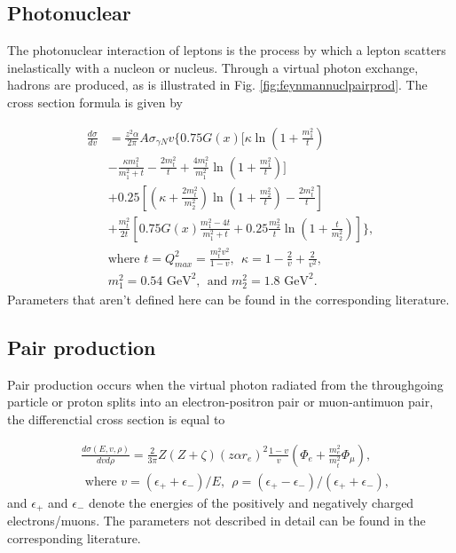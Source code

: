 \subsection{Photonuclear}
The photonuclear interaction of leptons is the process by which a lepton scatters inelastically with a nucleon or nucleus. Through a virtual photon exchange, hadrons are produced, as is illustrated in Fig. \ref{fig:feynmannuclpairprod}. The cross section formula is given by

\begin{equation} 
\begin{split} 
\frac{d\sigma}{dv} &= \frac{z^2 \alpha}{2\pi} A \sigma_{\gamma N} v  \Bigg \lbrace  0.75 G(x) \Bigg [\kappa \ln \left(1+\frac{m_1^2}{t}\right) \\
& -\frac{\kappa m_1^2}{m_1^2 + t} - \frac{2 m_t^2}{t} + \frac{4 m_t^2}{m_1^2} \ln \left(1+ \frac{m_1^2}{t} \right)  \Bigg] \\
& + 0.25 \left[ \left(\kappa + \frac{2m_t^2}{m_2^2} \right) \ln \left(1+\frac{m_2^2}{t} \right) - \frac{2m_t^2}{t}\right]\\
& + \frac{m_t^2}{2t} \left[ 0.75 G(x) \frac{m_1^2 -4t}{m_1^2 +t} +0.25 \frac{m_2^2}{t} \ln \left(1+\frac{t}{m_2^2} \right) \right] \Bigg \rbrace,\\
& \textrm{where \ \ } t = Q_{max}^2 = \frac{m_t^2 v^2}{1-v}, \ \ \kappa = 1-\frac{2}{v} + \frac{2}{v^2}, \\
& m_1^2 = 0.54 \textrm{ GeV}^2, \ \ \textrm{and \ \ \ } m_2^2 = 1.8 \textrm{\ GeV}^2.
\end{split} 
\end{equation}
Parameters that aren't defined here can be found in the corresponding literature.

\subsection{Pair production}
\label{subsec:pairprod}
Pair production occurs when the virtual photon radiated from the throughgoing particle or proton splits into an electron-positron pair or muon-antimuon pair, the differenctial cross section is equal to
 
\begin{equation}
\begin{split}
&\frac{d\sigma(E,v,\rho)}{dvd\rho} = \frac{2}{3\pi} Z(Z+\zeta)(z \alpha r_e)^2 \frac{1-v}{v} \left(\Phi_e + \frac{m_e^2}{m_t^2} \Phi_\mu \right), \\
& \textrm{ where \ \ } v = (\epsilon_+ + \epsilon_-)/E, \ \ \rho = (\epsilon_+ - \epsilon_-)/(\epsilon_+ + \epsilon_-),
\end{split}
\end{equation}
and $\epsilon_+$ and $\epsilon_-$ denote the energies of the positively and negatively charged electrons/muons. The parameters not described in detail can be found in the corresponding literature.


